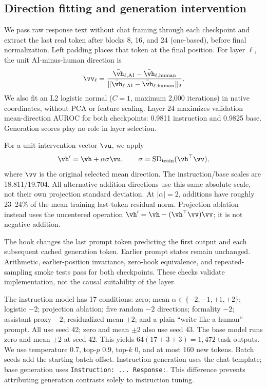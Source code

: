 \subsection{Direction fitting and generation intervention}
We pass raw response text without chat framing through each checkpoint and extract the last real token after blocks 8, 16, and 24 (one-based), before final normalization. Left padding places that token at the final position. For layer $\ell$, the unit AI-minus-human direction is
\begin{equation}
\vv_\ell=\frac{\bar{\vh}_{\ell,\mathrm{AI}}-\bar{\vh}_{\ell,\mathrm{human}}}
{\|\bar{\vh}_{\ell,\mathrm{AI}}-\bar{\vh}_{\ell,\mathrm{human}}\|_2}.
\end{equation}
We also fit an L2 logistic normal ($C=1$, maximum 2,000 iterations) in native coordinates, without PCA or feature scaling. Layer 24 maximizes validation mean-direction AUROC for both checkpoints: 0.9811 instruction and 0.9825 base. Generation scores play no role in layer selection.

For a unit intervention vector $\vu$, we apply
\begin{equation}\label{eq:add}
\vh' = \vh+\alpha\sigma\vu,\qquad
\sigma=\operatorname{SD}_{\mathrm{train}}(\vh^\top\vv),
\end{equation}
where $\vv$ is the original selected mean direction. The instruction/base scales are 18.811/19.704. All alternative addition directions use this same absolute scale, not their own projection standard deviation. At $|\alpha|=2$, additions have roughly 23--24\% of the mean training last-token residual norm. Projection ablation instead uses the uncentered operation $\vh'=\vh-(\vh^\top\vv)\vv$; it is not negative addition.

The hook changes the last prompt token predicting the first output and each subsequent cached generation token. Earlier prompt states remain unchanged. Arithmetic, earlier-position invariance, zero-hook equivalence, and repeated-sampling smoke tests pass for both checkpoints. These checks validate implementation, not the causal suitability of the layer.

The instruction model has 17 conditions: zero; mean $\alpha\in\{-2,-1,+1,+2\}$; logistic $-2$; projection ablation; five random $-2$ directions; formality $-2$; assistant proxy $-2$; residualized mean $\pm2$; and a plain ``write like a human'' prompt. All use seed 42; zero and mean $\pm2$ also use seed 43. The base model runs zero and mean $\pm2$ at seed 42. This yields $64(17+3+3)=1{,}472$ task outputs. We use temperature 0.7, top-$p$ 0.9, top-$k$ 0, and at most 160 new tokens. Batch seeds add the starting batch offset. Instruction generation uses the chat template; base generation uses \texttt{Instruction: ... Response:}. This difference prevents attributing generation contrasts solely to instruction tuning.

